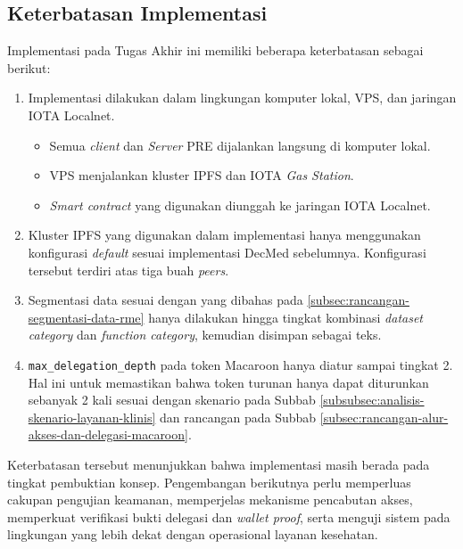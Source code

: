 \subsection{Keterbatasan Implementasi}
\label{subsec:keterbatasan-implementasi}

Implementasi pada Tugas Akhir ini memiliki beberapa keterbatasan sebagai berikut:

\begin{enumerate}
	\item Implementasi dilakukan dalam lingkungan komputer lokal, VPS, dan jaringan IOTA Localnet.
	      \begin{itemize}
		      \item Semua \textit{client} dan \textit{Server} PRE dijalankan langsung di komputer lokal.
		      \item VPS menjalankan kluster IPFS dan IOTA \textit{Gas Station}.
		      \item \textit{Smart contract} yang digunakan diunggah ke jaringan IOTA Localnet.
	      \end{itemize}
	\item Kluster IPFS yang digunakan dalam implementasi hanya menggunakan konfigurasi \textit{default} sesuai implementasi DecMed sebelumnya. Konfigurasi tersebut terdiri atas tiga buah \textit{peers}.
	\item Segmentasi data sesuai dengan yang dibahas pada \ref{subsec:rancangan-segmentasi-data-rme} hanya dilakukan hingga tingkat kombinasi \textit{dataset category} dan \textit{function category}, kemudian disimpan sebagai teks.
	\item \texttt{max\_delegation\_depth} pada token Macaroon hanya diatur sampai tingkat 2. Hal ini untuk memastikan bahwa token turunan hanya dapat diturunkan sebanyak 2 kali sesuai dengan skenario pada Subbab \ref{subsubsec:analisis-skenario-layanan-klinis} dan rancangan pada Subbab \ref{subsec:rancangan-alur-akses-dan-delegasi-macaroon}.
\end{enumerate}

Keterbatasan tersebut menunjukkan bahwa implementasi masih berada pada tingkat pembuktian konsep. Pengembangan berikutnya perlu memperluas cakupan pengujian keamanan, memperjelas mekanisme pencabutan akses, memperkuat verifikasi bukti delegasi dan \textit{wallet proof}, serta menguji sistem pada lingkungan yang lebih dekat dengan operasional layanan kesehatan.
